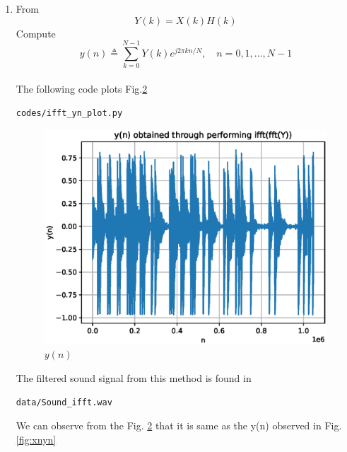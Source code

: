\documentclass[journal,12pt,twocolumn]{IEEEtran}
\renewcommand\thesection{\arabic{section}}
\begin{document}
\begin{enumerate}[label=\thesection.\arabic*
,ref=\thesection.\theenumi]
\begin{figure}[!ht]
\caption{$X(k) and H(k)$}
\label{fig:xnhnfft}
\end{figure}
\item From
\begin{equation}
Y(k) = X(k)H(k)
\end{equation}
Compute
\begin{equation}
y(n) \triangleq \sum_{k=0}^{N-1} Y(k) e^{j 2 \pi k n / N}, \quad n=0,1, \ldots, N-1
\end{equation}
\\
\solution
The following code plots Fig.\ref{fig:ynfft}
\begin{lstlisting}
codes/ifft_yn_plot.py
\end{lstlisting}
\begin{figure}[!ht]
\centering
\includegraphics[width=\columnwidth]{./figs/ifft_yn.eps}
\caption{$y(n)$}
\label{fig:ynfft}
\end{figure}
The filtered sound signal from this method is found in
\begin{lstlisting}
data/Sound_ifft.wav
\end{lstlisting}
We can observe from the Fig. \ref{fig:ynfft} that it is same as the y(n) observed in Fig.\ref{fig:xnyn}
\end{enumerate}
\end{document}
